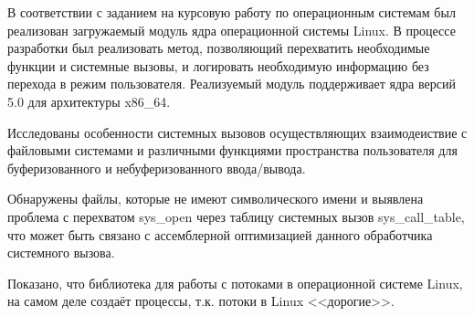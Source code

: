\Conclusion
    В соответствии с заданием на курсовую работу по операционным системам
    был реализован загружаемый модуль ядра операционной системы Linux.
    В процессе разработки был реализовать метод, 
    позволяющий перехватить необходимые функции и системные вызовы, 
    и логировать необходимую информацию без перехода в режим пользователя.
    Реализуемый модуль поддерживает ядра версий 5.0 для архитектуры x86\_64.

    Исследованы особенности системных вызовов осуществляющих взаимодеиствие с файловыми системами и
    различными функциями пространства пользователя для буферизованного и небуферизованного ввода/вывода.
    
    Обнаружены файлы, которые не имеют символического имени
    и выявлена проблема с перехватом sys\_open через таблицу системных вызов sys\_call\_table, 
    что может быть связано с ассемблерной оптимизацией данного 
    обработчика системного вызова.
    
    Показано, что библиотека для работы с потоками в операционной системе Linux,
    на самом деле создаёт процессы, т.к. потоки в Linux <<дорогие>>.

\pagebreak